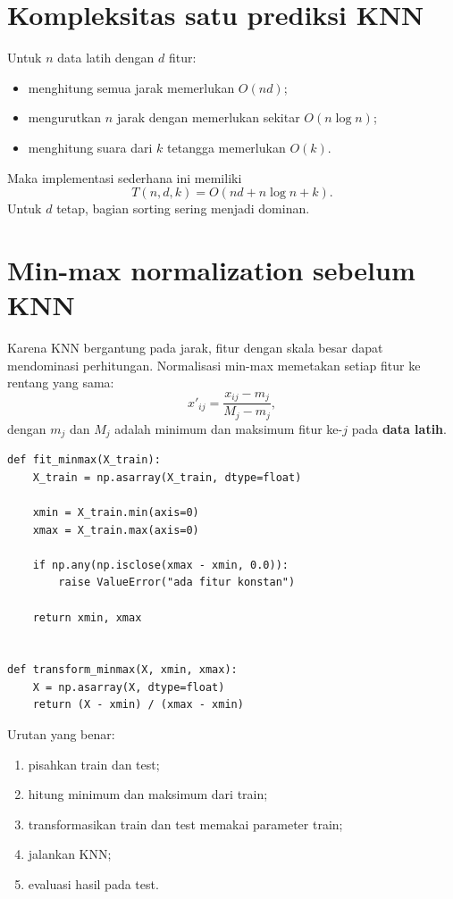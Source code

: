 \documentclass[11pt,a4paper]{report}
\newcommand{\kode}[1]{\texttt{\detokenize{#1}}}
\begin{document}
\section{Kompleksitas satu prediksi KNN}
Untuk $n$ data latih dengan $d$ fitur:
\begin{itemize}
  \item menghitung semua jarak memerlukan $O(nd)$;
  \item mengurutkan $n$ jarak dengan \kode{argsort} memerlukan sekitar $O(n\log n)$;
  \item menghitung suara dari $k$ tetangga memerlukan $O(k)$.
\end{itemize}
Maka implementasi sederhana ini memiliki
\[
T(n,d,k)
=
O(nd+n\log n+k).
\]
Untuk $d$ tetap, bagian sorting sering menjadi dominan.

\section{Min-max normalization sebelum KNN}
Karena KNN bergantung pada jarak, fitur dengan skala besar dapat mendominasi perhitungan. Normalisasi min-max memetakan setiap fitur ke rentang yang sama:
\[
x'_{ij}
=
\frac{x_{ij}-m_j}{M_j-m_j},
\]
dengan $m_j$ dan $M_j$ adalah minimum dan maksimum fitur ke-$j$ pada \textbf{data latih}.

\begin{lstlisting}
def fit_minmax(X_train):
    X_train = np.asarray(X_train, dtype=float)

    xmin = X_train.min(axis=0)
    xmax = X_train.max(axis=0)

    if np.any(np.isclose(xmax - xmin, 0.0)):
        raise ValueError("ada fitur konstan")

    return xmin, xmax


def transform_minmax(X, xmin, xmax):
    X = np.asarray(X, dtype=float)
    return (X - xmin) / (xmax - xmin)
\end{lstlisting}

Urutan yang benar:
\begin{enumerate}
  \item pisahkan train dan test;
  \item hitung minimum dan maksimum dari train;
  \item transformasikan train dan test memakai parameter train;
  \item jalankan KNN;
  \item evaluasi hasil pada test.
\end{enumerate}
\end{document}
